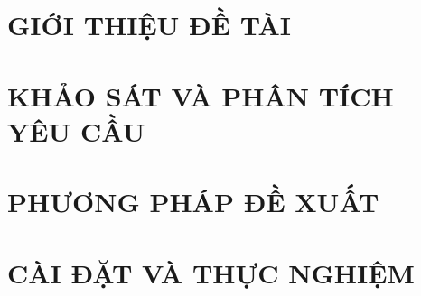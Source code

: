 \documentclass[a4paper,twoside]{report}
\theoremstyle{definition}
\begin{document}
\renewcommand{\listtablename}{DANH MỤC BẢNG BIỂU}
{\let\oldnumberline\numberline
\renewcommand{\numberline}{Bảng~\oldnumberline}
\listoftables}

\glsaddall 
 \renewcommand*{\glossaryname}{Danh sách thuật ngữ}
\renewcommand*{\acronymname}{DANH MỤC THUẬT NGỮ VÀ TỪ VIẾT TẮT}
\renewcommand*{\entryname}{Thuật ngữ}
\renewcommand*{\descriptionname}{Ý nghĩa}
\printnoidxglossary[type=\acronymtype]


% 


\newpage
{}

\pagestyle{fancy}
\fancyhf{}
\fancyhead[RE, LO]{\small\leftmark} %
\fancyfoot[RE, LO]{\thepage}

\chapter{GIỚI THIỆU ĐỀ TÀI}
\label{chapter:Introduction}

\newpage
\chapter{KHẢO SÁT VÀ PHÂN TÍCH YÊU CẦU}
\label{chapter:Related_works}



\newpage
\chapter{PHƯƠNG PHÁP ĐỀ XUẤT}
\label{chapter:Methodology}


\newpage
\chapter{CÀI ĐẶT VÀ THỰC NGHIỆM}
\label{chapter:Experiment}


\newpage
\end{document}
